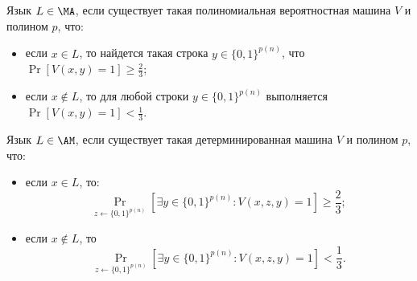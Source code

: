 




\setcounter{curtask}{46}


\begin{definition*}
    Язык $L \in \MA$, если  существует такая полиномиальная вероятностная машина $V$ и полином $p$, что:
    \begin{itemize}
        \item если $x \in L$, то найдется такая строка $y \in \{0, 1\}^{p(n)}$, что $\Pr[V(x, y) = 1] \ge
            \frac{2}{3}$;
        \item если $x \notin L$, то для любой строки $y \in \{0, 1\}^{p(n)}$ выполняется $\Pr[V(x, y) =
            1] < \frac{1}{3}$.
    \end{itemize}
\end{definition*}



\begin{definition*}
    Язык $L \in \AM$, если  существует такая детерминированная машина $V$ и полином $p$, что:
    \begin{itemize}
        \item если $x \in L$, то:
            $$
                \Pr\limits_{z \gets \{0, 1\}^{p(n)}}[\exists y \in \{0, 1\}^{p(n)}: V(x, z, y) = 1] \ge
                \frac{2}{3};
            $$
        \item если $x \notin L$, то
            $$
                \Pr\limits_{z \gets \{0, 1\}^{p(n)}}[\exists y \in \{0, 1\}^{p(n)}: V(x, z, y) = 1] <
                \frac{1}{3}.
            $$
            
    \end{itemize}
\end{definition*}


\breakline


